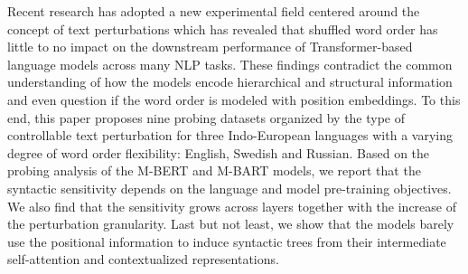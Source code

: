 Recent research has adopted a new experimental field centered around the concept of text perturbations which has revealed that shuffled word order has little to no impact on the downstream performance of Transformer-based language models across many NLP tasks. These findings contradict the common understanding of how the models encode hierarchical and structural information and even question if the word order is modeled with position embeddings. To this end, this paper proposes nine probing datasets organized by the type of controllable text perturbation for three Indo-European languages with a varying degree of word order flexibility: English, Swedish and Russian. Based on the probing analysis of the M-BERT and M-BART models, we report that the syntactic sensitivity depends on the language and model pre-training objectives. We also find that the sensitivity grows across layers together with the increase of the perturbation granularity. Last but not least, we show that the models barely use the positional information to induce syntactic trees from their intermediate self-attention and contextualized representations.
